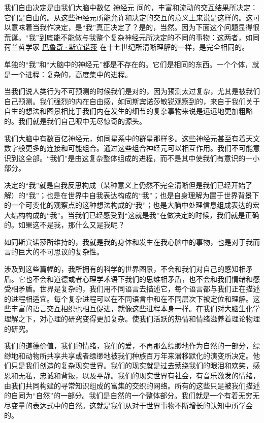     我们自由决定是由我们大脑中数亿
\href{http://toyhouse.cc/wiki/index.php/神经元}{神经元}
间的，丰富和流动的交互结果所决定：它们是自由的。从这些神经元所能允许和决定的交互的意义上来说是这样的。这可以意味着当我作决定，是“我”真正决定了？是的，当然。因为下面这个问题显得很荒诞。“我”到底能不能做与我整个复杂神经元所决定的不同的事物：这两者，如同荷兰哲学家
\href{https://en.wikipedia.org/wiki/Baruch Spinoza}{巴鲁奇·斯宾诺莎}
在十七世纪所清晰理解的一样，是完全相同的。

    单独的“我”和“大脑中的神经元”都是不存在的。它们是相同的东西。一个个体，就是一个进程：复杂的，高度集中的进程。

    当我们说人类行为不可预测的时候我们是对的，因为预测太过复杂，尤其是被我们自己预测。我们强烈的内在自由感，如同斯宾诺莎敏锐观察到的，来自于我们关于自生的想法和图景相比于我们内在发生的细节的复杂事物来说是远远地更加粗略的。我们就是我们自己眼中无尽惊奇的源头。

    我们大脑中有数百亿神经元，如同星系中的群星那样多。这些神经元甚至有着天文数字般更多的连接和可能组合。通过这些组合神经元可以相互作用。我们不可能意识到这全部。“我们”是由这复杂整体组成的进程，而不是其中使我们有意识的一小部分。
 
   决定的“我”就是自我反思构成（某种意义上仍然不完全清晰但是我们已经开始了解）的“我”；也是在世界中自我表达构成的“我”；也是自身理解为置于世界背景下的一个可变化的观察点的这种想法构成的“我”；也是大脑中处理信息组成表达的宏大结构构成的“我”。当我们已经感受到“这就是我”在做决定的时候，我们就是正确的。如果这不是我，那什么又是我呢？

    如同斯宾诺莎所维持的，我就是我的身体和发生在我心脑中的事物，也是对于我而言的巨大的不可思议的复杂性。

    涉及到这些篇幅的，我所拥有的科学的世界图景，不会和我们对自己的感知相矛盾。它也不会和道德或者心理学术语下我们的思维相矛盾，也不会和我们情绪和感受相矛盾。世界是复杂的，我们用不同语言去描述它，每个语言都与我们正在描述的进程相适宜。每个复杂进程可以在不同语言中和在不同层次下被定位和理解。这些丰富的语言交互相织也相互促进，就像这些进程本身一样。在我们对大脑生化学理解之下，对心理的研究变得更加复杂。使我们活跃的热情和情绪滋养着理论物理的研究。

    我们的道德价值，我们的情绪，我们的爱，不再那么缥缈地作为自然的一部分，缥缈地和动物所共享共享或者缥缈地被我们种族百万年来潜移默化的演变所决定。他们只是我们创造的复杂现实世界。我们的现实就是过去萦绕我们的眼泪和欢笑，感恩和无私，忠诚和背叛，以及平静。我们的现实世界有社会，有音乐激发的情绪，由我们共同构建的寻常知识组成的富集的交织的网络。所有的这些只是被我们描述的自同为“自然”的一部分。我们是自然的一个整体部分。我们就是一个有着无穷无尽变量的表达式中的自然。这就是我们从对于世界事物不断增长的认知中所学会的。
 
